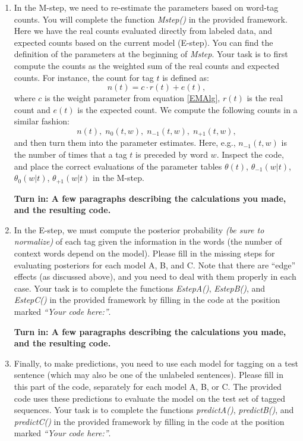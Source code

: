 \begin{enumerate}

\item  In the M-step, we need to re-estimate the parameters based on word-tag counts. 
You will complete the function \textit{Mstep()} in the provided framework. Here we have
the real counts evaluated directly from labeled data, and expected counts based
on the current model (E-step). You can find the definition of the parameters at 
the beginning of \textit{Mstep}. Your task
is to first compute the counts as the weighted sum of the real counts and
expected counts. For instance, the count for tag $t$ is defined as: 
\[
n(t) = c \cdot r(t) + e(t),
\]
where $c$ is the weight parameter from equation \ref{EMAlg}, $r(t)$ is the real count and
$e(t)$ is the expected count. We compute the following counts in a similar
fashion:
\[
n(t),\; n_0(t,w),\; n_{-1}(t,w),\;n_{+1}(t,w),
\]
and then turn them into the parameter estimates. Here, e.g., $n_{-1}(t,w)$ is the number of times that a tag $t$ is preceded by word $w$. Inspect the code, and place the correct evaluations of the parameter tables $\theta(t)$, $\theta_{-1}(w|t)$, $\theta_0(w|t)$, $\theta_{+1}(w|t)$ in the M-step.  

\textbf{Turn in: A few paragraphs describing the calculations you made, and the
resulting code.}

\item  In the E-step, we must compute the posterior probability \textit{(be sure to normalize)} of each tag given the information in the words (the number of context words depend on the model). Please fill in the missing steps for evaluating posteriors for each model A, B, and C. Note that there are ``edge'' effects (as discussed above), and you need to deal with them properly in each case. Your task is to complete the functions \textit{EstepA()}, \textit{EstepB()},
and \textit{EstepC()} in the provided framework by filling in the code at the position
marked \textit{``Your code here:''}. 

\textbf{Turn in: A few paragraphs describing the calculations you made, and the
resulting code.}

\item Finally, to make predictions, you need to use each model for tagging on a test sentence (which may also be one of the unlabeled sentences). Please fill in this part of the code, separately for each model A, B, or C. The provided
 code uses these predictions to evaluate the model on the test set of tagged
 sequences. Your task is to complete the functions \textit{predictA()}, \textit{predictB()},
 and \textit{predictC()} in the provided framework by filling in the code at the position
 marked \textit{``Your code here:''}.


\end{enumerate}
